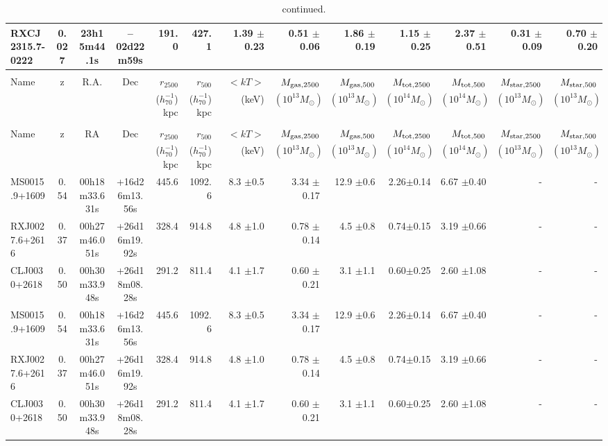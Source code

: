 \documentclass{aa}
\begin{document}
\begin{landscape}
\begin{longtable}{lcccrrrrrrrrr}
RXCJ2315.7-0222 & 0.027 & 23h15m44.1s & --02d22m59s& 191.0 &427.1 & 1.39 $\pm$ 0.23 & 0.51 $\pm$ 0.06 &1.86 $\pm$ 0.19& 1.15 $\pm$ 0.25 &2.37 $\pm$ 0.51&  0.31 $\pm$ 0.09 & 0.70 $\pm$ 0.20\\
\hline
\endfirsthead
\caption{continued.}\\
\hline\hline
Name & z & R.A. & Dec  & $r_{2500}$ & $r_{500}$& $ <kT> $ & $M_{\rm gas,2500} $ &  $M_{\rm gas,500} $ &  $M_{\rm tot,2500} $ &  $M_{\rm tot,500} $&    $M_{\rm star,2500} $ &  $M_{\rm star,500} $\\
& & & &  ($h_{70}^{-1}$) kpc & ($h_{70}^{-1}$) kpc &(keV) & $(10^{13} M_{\odot})$ & $(10^{13} M_{\odot})$ & $(10^{14} M_{\odot})$ & $(10^{14} M_{\odot})$ & $(10^{13} M_{\odot})$ & $(10^{13} M_{\odot})$\\
\hline\hline
\endhead
\hline
\endfoot
\hline
\multicolumn{13}{c}{Clusters from M12}\\
Name & z & RA & Dec &$r_{2500}$ &$r_{500}$& $ <kT> $ & $M_{\rm gas,2500} $ &  $M_{\rm gas,500} $ &  $M_{\rm tot,2500} $ &  $M_{\rm tot,500} $ &    $M_{\rm star,2500} $ &  $M_{\rm star,500} $\\
 & & & & ($h_{70}^{-1}$) kpc & ($h_{70}^{-1}$) kpc &(keV) & $(10^{13} M_{\odot})$ & $(10^{13} M_{\odot})$ & $(10^{14} M_{\odot})$ & $(10^{14} M_{\odot})$ & $(10^{13} M_{\odot})$ & $(10^{13} M_{\odot})$\\
\hline
MS0015.9+1609     &0.54 & 00h18m33.631s &+16d26m13.56s  &  445.6   &  1092.6  &  8.3  $\pm$0.5 & 3.34 $\pm$ 0.17&12.9 $\pm$0.6  & 2.26$\pm$0.14& 6.67 $\pm$0.40& - & -  \\
RXJ0027.6+2616    &0.37 & 00h27m46.051s &+26d16m19.92s  &  328.4   &  914.8   &  4.8  $\pm$1.0 & 0.78 $\pm$ 0.14&4.5  $\pm$0.8  & 0.74$\pm$0.15& 3.19 $\pm$0.66& - & -   \\
CLJ0030+2618	&0.50 & 00h30m33.948s &+26d18m08.28s  &  291.2   &  811.4   &  4.1  $\pm$1.7 & 0.60 $\pm$ 0.21&3.1  $\pm$1.1  & 0.60$\pm$0.25& 2.60 $\pm$1.08& - & -   \\
MS0015.9+1609     &0.54 & 00h18m33.631s &+16d26m13.56s  &  445.6   &  1092.6  &  8.3  $\pm$0.5 & 3.34 $\pm$ 0.17&12.9 $\pm$0.6  & 2.26$\pm$0.14& 6.67 $\pm$0.40& - & -  \\
RXJ0027.6+2616    &0.37 & 00h27m46.051s &+26d16m19.92s  &  328.4   &  914.8   &  4.8  $\pm$1.0 & 0.78 $\pm$ 0.14&4.5  $\pm$0.8  & 0.74$\pm$0.15& 3.19 $\pm$0.66& - & -   \\
CLJ0030+2618	 &0.50 & 00h30m33.948s &+26d18m08.28s  &  291.2   &  811.4   &  4.1  $\pm$1.7 & 0.60 $\pm$ 0.21&3.1  $\pm$1.1  & 0.60$\pm$0.25& 2.60 $\pm$1.08& - & -   \\

\end{longtable}
\end{landscape}
\end{document}

